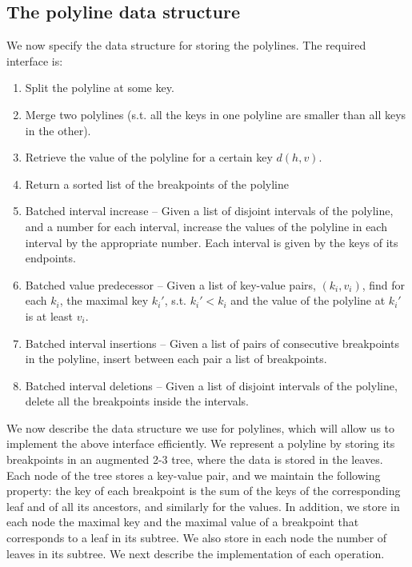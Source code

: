 \documentclass[a4paper,UKenglish]{lipics-v2016}
\theoremstyle{plain}
\begin{document}
\subsection{The polyline data structure} We now specify the data structure for storing the polylines. The required interface is:
\begin{enumerate}
\item \label{op1} Split the polyline at some key.
\item \label{op2} Merge two polylines (s.t. all the keys in one polyline are smaller than all keys in the other).
\item \label{op3} Retrieve the value of the polyline for a certain key $d(h,v)$.
\item \label{op4}Return a sorted list of the breakpoints of the polyline
\item \label{op5} Batched interval increase -- Given a list of disjoint intervals of the polyline, and a number for each interval, increase the values of the polyline in each interval by the appropriate number. Each interval is given by the keys of its endpoints.
\item \label{op6} Batched value predecessor -- Given a list of key-value pairs, $(k_i,v_i)$, find for each $k_i$, the maximal key $k_{i}'$, s.t. $k_{i}' < k_i$ and the value of the polyline at $k_{i}'$ is at least $v_i$.
\item \label{op7} Batched interval insertions -- Given a list of pairs of consecutive breakpoints in the polyline, insert between each pair a list of breakpoints.
\item \label{op8} Batched interval deletions -- Given a list of disjoint intervals of the polyline, delete all the breakpoints inside the intervals.
\end{enumerate}

We now describe the data structure we use for polylines, which will allow us to implement the above interface efficiently. We represent a polyline by storing its breakpoints in an augmented 2-3 tree, where the data is stored in the leaves. Each node of the tree stores a key-value pair, and we maintain the following property: the key of each breakpoint is the sum of the keys of the corresponding leaf and of all its ancestors, and similarly for the values. In addition, we store in each node the maximal key and the maximal value of a breakpoint that corresponds to a leaf in its subtree. We also store in each node the number of leaves in its subtree. We next describe the implementation of each operation.
\end{document}
